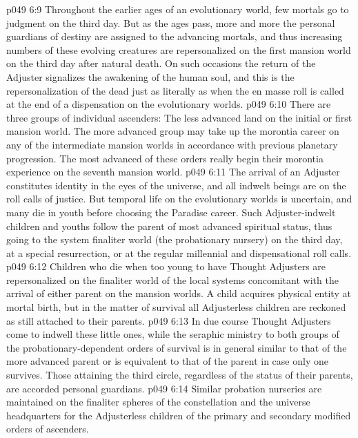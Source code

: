 \vs p049 6:9 Throughout the earlier ages of an evolutionary world, few mortals go to judgment on the third day. But as the ages pass, more and more the personal guardians of destiny are assigned to the advancing mortals, and thus increasing numbers of these evolving creatures are repersonalized on the first mansion world on the third day after natural death. On such occasions the return of the Adjuster signalizes the awakening of the human soul, and this is the repersonalization of the dead just as literally as when the en masse roll is called at the end of a dispensation on the evolutionary worlds.
\vs p049 6:10 There are three groups of individual ascenders: The less advanced land on the initial or first mansion world. The more advanced group may take up the morontia career on any of the intermediate mansion worlds in accordance with previous planetary progression. The most advanced of these orders really begin their morontia experience on the seventh mansion world.
\pc \vs p049 6:11 \bibnobreakspace {} The arrival of an Adjuster constitutes identity in the eyes of the universe, and all indwelt beings are on the roll calls of justice. But temporal life on the evolutionary worlds is uncertain, and many die in youth before choosing the Paradise career. Such Adjuster\hyp{}indwelt children and youths follow the parent of most advanced spiritual status, thus going to the system finaliter world (the probationary nursery) on the third day, at a special resurrection, or at the regular millennial and dispensational roll calls.
\vs p049 6:12 Children who die when too young to have Thought Adjusters are repersonalized on the finaliter world of the local systems concomitant with the arrival of either parent on the mansion worlds. A child acquires physical entity at mortal birth, but in the matter of survival all Adjusterless children are reckoned as still attached to their parents.
\vs p049 6:13 In due course Thought Adjusters come to indwell these little ones, while the seraphic ministry to both groups of the probationary\hyp{}dependent orders of survival is in general similar to that of the more advanced parent or is equivalent to that of the parent in case only one survives. Those attaining the third circle, regardless of the status of their parents, are accorded personal guardians.
\vs p049 6:14 Similar probation nurseries are maintained on the finaliter spheres of the constellation and the universe headquarters for the Adjusterless children of the primary and secondary modified orders of ascenders.
